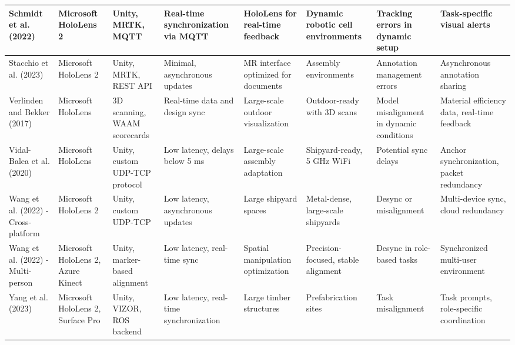 {\begin{landscape}
\begin{longtable}{@{}p{1.8cm}p{1.8cm}p{1.8cm}p{1.8cm}p{1.8cm}p{1.8cm}p{1.8cm}p{1.8cm}@{}}
\midrule
Schmidt et al. (2022) & Microsoft HoloLens 2 & Unity, MRTK, MQTT & Real-time synchronization via MQTT & HoloLens for real-time feedback & Dynamic robotic cell environments & Tracking errors in dynamic setup & Task-specific visual alerts \\
\midrule
Stacchio et al. (2023) & Microsoft HoloLens 2 & Unity, MRTK, REST API & Minimal, asynchronous updates & MR interface optimized for documents & Assembly environments & Annotation management errors & Asynchronous annotation sharing \\
\midrule
Verlinden and Bekker (2017) & Microsoft HoloLens & 3D scanning, WAAM scorecards & Real-time data and design sync & Large-scale outdoor visualization & Outdoor-ready with 3D scans & Model misalignment in dynamic conditions & Material efficiency data, real-time feedback \\
\midrule
Vidal-Balea et al. (2020) & Microsoft HoloLens & Unity, custom UDP-TCP protocol & Low latency, delays below 5 ms & Large-scale assembly adaptation & Shipyard-ready, 5 GHz WiFi & Potential sync delays & Anchor synchronization, packet redundancy \\
\midrule
Wang et al. (2022) - Cross-platform & Microsoft HoloLens 2 & Unity, custom UDP-TCP & Low latency, asynchronous updates & Large shipyard spaces & Metal-dense, large-scale shipyards & Desync or misalignment & Multi-device sync, cloud redundancy \\
\midrule
Wang et al. (2022) - Multi-person & Microsoft HoloLens 2, Azure Kinect & Unity, marker-based alignment & Low latency, real-time sync & Spatial manipulation optimization & Precision-focused, stable alignment & Desync in role-based tasks & Synchronized multi-user environment \\

Yang et al. (2023) & Microsoft HoloLens 2, Surface Pro & Unity, VIZOR, ROS backend & Low latency, real-time synchronization & Large timber structures & Prefabrication sites & Task misalignment & Task prompts, role-specific coordination \\
\end{longtable}
\end{landscape}
\clearpage
} 